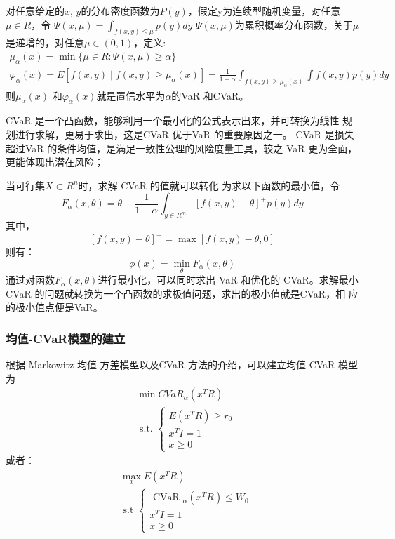 \documentclass[withoutpreface,bwprint]{cumcmthesis} %
\begin{document}
	对任意给定的$x$, $y$的分布密度函数为$P( y)$，假定y为连续型随机变量，对任意
	$\mu \in R$，令
$\Psi(x, \mu)=\int_{f(x, y) \leq \mu} p(y) d y$
$\Psi(x, \mu)$为累积概率分布函数，关于$\mu$是递增的，对任意$\mu \in(0,1)$，定义:
\begin{equation}
\begin{gathered}
\mu_{\alpha}(x)=\min \{\mu \in R: \Psi(x, \mu) \geq \alpha\} \\
\varphi_{\alpha}(x)=E\left[f(x, y) \mid f(x, y) \geq \mu_{\alpha}(x)\right]=\frac{1}{1-\alpha} \int_{f(x, y) \geq \mu_{\alpha}(x)} \int f(x, y) p(y) d y
\end{gathered}
\end{equation}
	则$\mu_{\alpha}(x)$ 和$\varphi_{\alpha}(x)$就是置信水平为$\alpha$的VaR 和CVaR。
	
	CVaR 是一个凸函数，能够利用一个最小化的公式表示出来，并可转换为线性
	规划进行求解，更易于求出，这是CVaR 优于VaR 的重要原因之一。
	CVaR 是损失超过VaR 的条件均值，是满足一致性公理的风险度量工具，较之
	VaR 更为全面，更能体现出潜在风险；
	
当可行集$X \subset R^{n}$时，求解 CVaR 的值就可以转化
	为求以下函数的最小值，令
$$
F_{\alpha}(x, \theta)=\theta+\frac{1}{1-\alpha} \int_{y \in R^{m}}[f(x, y)-\theta]^{+} p(y) d y
$$
其中，$$
[f(x, y)-\theta]^{+}=\max [f(x, y)-\theta, 0]
$$
则有：
$$
\phi(x)=\min _{\theta} F_{\alpha}(x, \theta)
$$
	通过对函数$F_{\alpha}(x, \theta)$进行最小化，可以同时求出 VaR 和优化的 CVaR。求解最小CVaR 的问题就转换为一个凸函数的求极值问题，求出的极小值就是CVaR，相
	应的极小值点便是VaR。
	\subsubsection{均值-CVaR模型的建立}
	根据 Markowitz 均值-方差模型以及CVaR 方法的介绍，可以建立均值-CVaR
	模型为
	\begin{equation}
	\begin{aligned}
	&\min C V a R_{\alpha}\left(x^{T} R\right)\\
	&\text { s.t. }\left\{\begin{array}{l}
	E\left(x^{T} R\right) \geq r_{0} \\
	x^{T} I=1 \\
	x \geq 0
	\end{array}\right.
	\end{aligned}
	\end{equation}
	或者：
	\begin{equation}
	\begin{aligned}
	&\max _{x} E\left(x^{T} R\right) \\
	&\text { s.t }\left\{\begin{array}{l}
	\text { CVaR }_{\alpha}\left(x^{T} R\right) \leq W_{0} \\
	x^{T} I=1 \\
	x \geq 0
	\end{array}\right.
	\end{aligned}
	\end{equation}
	
\end{document}
